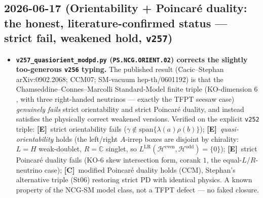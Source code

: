 \documentclass[11pt]{article}
\providecommand{\mE}{\textbf{[E]}}\providecommand{\mC}{\textbf{[C]}}
\providecommand{\vref}[1]{\texttt{#1}}
\begin{document}
\subsection*{2026-06-17 (Orientability + Poincar\'e duality: the honest, literature-confirmed status --- strict fail, weakened hold, \texttt{v257})}
\begin{itemize}
\item \textbf{\texttt{v257\_quasiorient\_modpd.py} (\texttt{PS.NCG.ORIENT.02}) corrects the slightly
  too-generous \vref{v256} typing.} The published result (Cacic--Stephan arXiv:0902.2068; CCM07;
  SM-vacuum hep-th/0601192) is that the Chamseddine--Connes--Marcolli Standard-Model finite triple
  (KO-dimension $6$, with three right-handed neutrinos --- exactly the TFPT seesaw case) \emph{genuinely
  fails} strict orientability and strict Poincar\'e duality, and instead satisfies the physically correct
  weakened versions. Verified on the explicit \vref{v252} triple: \mE\ strict orientability fails
  ($\gamma\notin\mathrm{span}\{\lambda(a)\rho(b)\}$); \mE\ \emph{quasi-orientability} holds (the left/right
  $A$-irrep boxes are disjoint by chirality: $L=H$ weak-doublet, $R=\mathbb C$ singlet, so
  $L^{\mathrm{LR}}(\mathcal H^{\mathrm{even}},\mathcal H^{\mathrm{odd}})=\{0\}$); \mE\ strict Poincar\'e
  duality fails (KO-$6$ skew intersection form, corank $1$, the equal-$L/R$-neutrino case); \mC\ modified
  Poincar\'e duality holds (CCM), Stephan's alternative triple (St06) restoring strict PD with identical
  physics. A known property of the NCG-SM model class, not a TFPT defect --- no faked closure.
\end{itemize}
\end{document}
